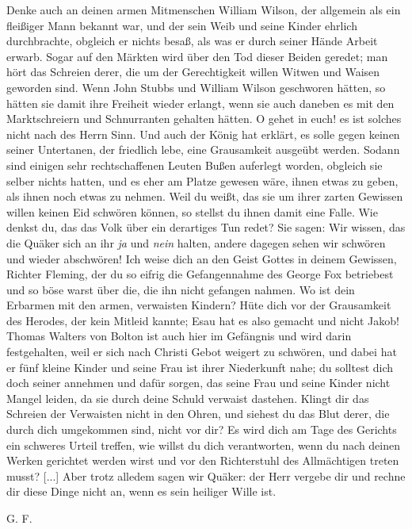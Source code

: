 {  Denke auch an deinen armen Mitmenschen William Wilson,
  der allgemein als ein fleißiger Mann bekannt war, und der sein
  Weib und seine Kinder ehrlich durchbrachte, obgleich er nichts besaß, 
  als was er durch seiner Hände Arbeit erwarb. Sogar auf
  den Märkten wird über den Tod dieser Beiden geredet; man hört
  das Schreien derer, die um der Gerechtigkeit willen Witwen und
  Waisen geworden sind. Wenn John Stubbs und William Wilson 
  geschworen hätten, so hätten sie damit ihre Freiheit wieder
  erlangt, wenn sie auch daneben es mit den Marktschreiern und
  Schnurranten gehalten hätten. O gehet in euch! es ist solches
  nicht nach des Herrn Sinn. Und auch der König hat erklärt, es
  solle gegen keinen seiner Untertanen, der friedlich lebe, eine 
  Grausamkeit ausgeübt werden. Sodann sind einigen sehr rechtschaffenen
  Leuten Bußen auferlegt worden, obgleich sie selber nichts hatten,
  und es eher am Platze gewesen wäre, ihnen etwas zu geben, als
  ihnen noch etwas zu nehmen. Weil du weißt, das sie um ihrer zarten
  Gewissen willen keinen Eid schwören können, so stellst du ihnen damit 
  eine Falle. Wie denkst du, das das Volk über ein derartiges
  Tun redet? Sie sagen: Wir wissen, das die Quäker sich an ihr
  \textit{ja} und \textit{nein} halten, andere dagegen sehen 
  wir schwören und wieder abschwören! 
  Ich weise dich an den Geist Gottes in deinem Gewissen, 
  Richter Fleming, der du so eifrig die Gefangennahme
  des George Fox betriebest und so böse warst über die, die ihn
  nicht gefangen nahmen. Wo ist dein Erbarmen mit den armen,
  verwaisten Kindern? Hüte dich vor der Grausamkeit des Herodes,
  der kein Mitleid kannte; Esau hat es also gemacht und nicht
  Jakob! Thomas Walters 
  von Bolton ist auch hier im Gefängnis 
  und wird darin festgehalten, weil er sich nach Christi Gebot
  weigert zu schwören, und dabei hat er fünf kleine Kinder und seine
  Frau ist ihrer Niederkunft nahe; du solltest dich doch seiner 
  annehmen und dafür sorgen, das seine Frau und seine Kinder nicht
  Mangel leiden, da sie durch deine Schuld verwaist dastehen.
  Klingt dir das Schreien der Verwaisten nicht in den Ohren, und
  siehest du das Blut derer, die durch dich umgekommen sind, nicht
  vor dir? Es wird dich am Tage des Gerichts ein schweres Urteil 
  treffen, wie willst du dich verantworten, wenn du nach deinen
  Werken gerichtet werden wirst und vor den Richterstuhl des
  Allmächtigen treten musst? [...] Aber trotz alledem sagen wir
  Quäker: der Herr vergebe dir und rechne dir diese Dinge nicht
  an, wenn es sein heiliger Wille ist.
  \medskip 
  \begin{flushright}G. F.\end{flushright}
}

